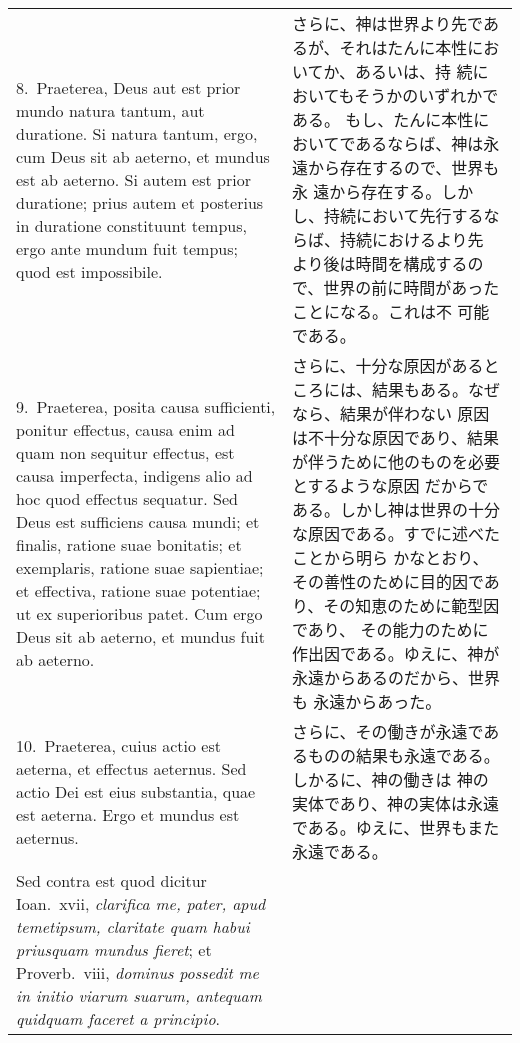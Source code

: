 \documentclass[10pt]{jsarticle} %
\begin{document}
\begin{longtable}{p{21em}p{21em}}

8.~{\sc Praeterea}, Deus aut est prior mundo natura tantum, aut duratione. Si
 natura tantum, ergo, cum Deus sit ab aeterno, et mundus est ab
 aeterno. Si autem est prior duratione; prius autem et posterius in
 duratione constituunt tempus, ergo ante mundum fuit tempus; quod est
 impossibile.

&
さらに、神は世界より先であるが、それはたんに本性においてか、あるいは、持
 続においてもそうかのいずれかである。
もし、たんに本性においてであるならば、神は永遠から存在するので、世界も永
 遠から存在する。しかし、持続において先行するならば、持続におけるより先
 より後は時間を構成するので、世界の前に時間があったことになる。これは不
 可能である。

\\



9.~{\sc Praeterea}, posita causa sufficienti, ponitur effectus, causa enim ad
 quam non sequitur effectus, est causa imperfecta, indigens alio ad hoc
 quod effectus sequatur. Sed Deus est sufficiens causa mundi; et
 finalis, ratione suae bonitatis; et exemplaris, ratione suae
 sapientiae; et effectiva, ratione suae potentiae; ut ex superioribus
 patet. Cum ergo Deus sit ab aeterno, et mundus fuit ab aeterno.

&

さらに、十分な原因があるところには、結果もある。なぜなら、結果が伴わない
 原因は不十分な原因であり、結果が伴うために他のものを必要とするような原因
 だからである。しかし神は世界の十分な原因である。すでに述べたことから明ら
 かなとおり、その善性のために目的因であり、その知恵のために範型因であり、
 その能力のために作出因である。ゆえに、神が永遠からあるのだから、世界も
 永遠からあった。


\\



10.~{\sc Praeterea}, cuius actio est aeterna, et effectus
 aeternus. Sed actio Dei est eius substantia, quae est aeterna. Ergo et
 mundus est aeternus.

&
さらに、その働きが永遠であるものの結果も永遠である。しかるに、神の働きは
 神の実体であり、神の実体は永遠である。ゆえに、世界もまた永遠である。

\\



{\sc Sed contra est quod} dicitur Ioan.~{\sc xvii}, {\it clarifica me,
 pater, apud temetipsum, claritate quam habui priusquam mundus fieret};
 et Proverb.~{\sc viii}, {\it dominus possedit me in initio viarum
 suarum, antequam quidquam faceret a principio}.


\end{longtable}
\end{document}
